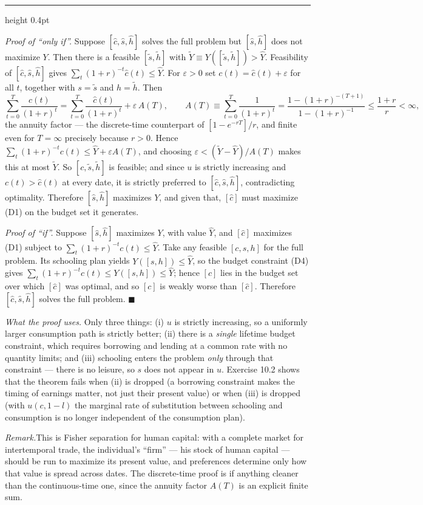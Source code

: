 \documentclass[11pt,letterpaper,reqno]{amsart}
\makeatletter
\newcommand{\wh}[1]{\widehat{#1}}
\newcommand{\wt}[1]{\widetilde{#1}}
\newcommand{\as@head}[3]{%
  \par\addvspace{1.6ex}\penalty-200\relax
  \phantomsection
  \addcontentsline{toc}{subsection}{#1 #2\texorpdfstring{\ifx\relax#3\relax\else\quad #3\fi}{}}%
  {\color{RuleGrey}\hrule height 0.4pt}%
  \nobreak\vspace{0.8ex}\nobreak
  \noindent{\bfseries #1 #2}%
  \ifx\relax#3\relax\else\quad{\bfseries\itshape #3}\fi
  \par\nobreak\vspace{0.4ex}\nobreak
  \as@beginstatement
}
\newcommand{\as@beginstatement}{\begingroup\itshape\ignorespaces}
\newenvironment{aex}[2]{\as@head{Exercise}{#1}{#2}}{\par\addvspace{1.2ex}}
\newcommand{\rmk}[1]{%
  \par\vspace{0.6ex}%
  {\small\noindent\textit{Remark.}\hspace{0.5em}#1\par}%
  \vspace{0.4ex}%
}
\renewcommand{\as@beginstatement}{\ignorespaces}
\makeatother
\begin{document}
\begin{aex}{10.1}{}
\emph{Proof of ``only if''.}  Suppose $[\wh c,\wh s,\wh h]$ solves the full problem but
$[\wh s,\wh h]$ does not maximize $Y$.  Then there is a feasible $[\wt s,\wt h]$ with
$\wt Y\equiv Y([\wt s,\wt h])>\wh Y$.  Feasibility of $[\wh c,\wh s,\wh h]$ gives
$\sum_{t}(1+r)^{-t}\wh c(t)\le\wh Y$.  For $\varepsilon>0$ set $c(t)=\wh c(t)+\varepsilon$ for all
$t$, together with $s=\wt s$ and $h=\wt h$.  Then
\[
\sum_{t=0}^{T}\frac{c(t)}{(1+r)^{t}}
=\sum_{t=0}^{T}\frac{\wh c(t)}{(1+r)^{t}}+\varepsilon\,A(T),
\qquad
A(T)\equiv\sum_{t=0}^{T}\frac{1}{(1+r)^{t}}=\frac{1-(1+r)^{-(T+1)}}{1-(1+r)^{-1}}
\le\frac{1+r}{r}<\infty ,
\]
the annuity factor --- the discrete-time counterpart of $[1-e^{-rT}]/r$, and finite even for
$T=\infty$ precisely because $r>0$.  Hence
$\sum_{t}(1+r)^{-t}c(t)\le\wh Y+\varepsilon A(T)$, and choosing
$\varepsilon<(\wt Y-\wh Y)/A(T)$ makes this at most $\wt Y$.  So $[c,\wt s,\wt h]$ is feasible;
and since $u$ is strictly increasing and $c(t)>\wh c(t)$ at every date, it is strictly preferred
to $[\wh c,\wh s,\wh h]$, contradicting optimality.  Therefore $[\wh s,\wh h]$ maximizes $Y$, and
given that, $[\wh c]$ must maximize (D1) on the budget set it generates.

\emph{Proof of ``if''.}  Suppose $[\wh s,\wh h]$ maximizes $Y$, with value $\wh Y$, and $[\wh c]$
maximizes (D1) subject to $\sum_{t}(1+r)^{-t}c(t)\le\wh Y$.  Take any feasible
$[c,s,h]$ for the full problem.  Its schooling plan yields $Y([s,h])\le\wh Y$, so the budget
constraint (D4) gives $\sum_{t}(1+r)^{-t}c(t)\le Y([s,h])\le\wh Y$; hence $[c]$ lies in the budget
set over which $[\wh c]$ was optimal, and so $[c]$ is weakly worse than $[\wh c]$.  Therefore
$[\wh c,\wh s,\wh h]$ solves the full problem. $\blacksquare$

\emph{What the proof uses.}  Only three things: (i) $u$ is strictly increasing, so a uniformly
larger consumption path is strictly better; (ii) there is a \emph{single} lifetime budget
constraint, which requires borrowing and lending at a common rate with no quantity limits; and
(iii) schooling enters the problem \emph{only} through that constraint --- there is no leisure, so
$s$ does not appear in $u$.  Exercise 10.2 shows that the theorem fails when (ii) is dropped (a
borrowing constraint makes the timing of earnings matter, not just their present value) or when
(iii) is dropped (with $u(c,1-l)$ the marginal rate of substitution between schooling and
consumption is no longer independent of the consumption plan).

\rmk{This is Fisher separation for human capital: with a complete market for intertemporal trade,
the individual's ``firm'' --- his stock of human capital --- should be run to maximize its present
value, and preferences determine only how that value is spread across dates.  The discrete-time
proof is if anything cleaner than the continuous-time one, since the annuity factor $A(T)$ is an
explicit finite sum.}
\end{aex}
\end{document}
